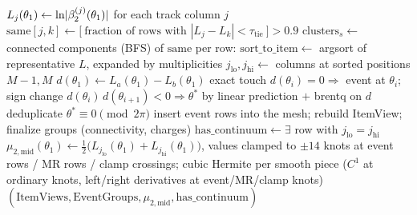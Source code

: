 
\begin{algorithm}
\caption{\textsc{AnalyzeMu2Mid}$(zm,\mathrm{poly},E,\mu_1;\tau_{\mathrm{tie}},\tau_{\mathrm{cross}})$ —
build the $\mu_{2,\mathrm{mid}}$ base manifold: continuum clustering, pairwise crossings, Hermite path.}
\label{alg:analyze-mu2mid}
\begin{algorithmic}[1]
\State {}
  \State $L_j(\theta_1)\gets\ln\lvert \beta_2^{(j)}(\theta_1)\rvert$ for each track column $j$
  \State $\mathrm{same}[j,k]\gets\Big[\ \text{fraction of rows with } |L_j-L_k|<\tau_{\mathrm{tie}}\ \Big] > 0.9$
  \State $\mathrm{clusters}_s\gets$ connected components (BFS) of $\mathrm{same}$
\EndFor
\State {}
\State per row: $\mathrm{sort\_to\_item}\gets$ argsort of representative $L$, expanded by multiplicities
\State $j_{\mathrm{lo}},j_{\mathrm{hi}}\gets$ columns at sorted positions $M{-}1,M$
\State {}
  \State $d(\theta_1)\gets L_a(\theta_1)-L_b(\theta_1)$
  \State exact touch $d(\theta_i)=0\Rightarrow$ event at $\theta_i$; sign change $d(\theta_i)\,d(\theta_{i+1})<0\Rightarrow\theta^*$ by linear prediction $+$ brentq on $d$
  \State deduplicate $\theta^*\equiv0\pmod{2\pi}$
\EndFor
\State {}
\State insert event rows into the mesh; rebuild ItemView; finalize groups (connectivity, charges)
\State $\mathrm{has\_continuum}\gets\exists$ row with $j_{\mathrm{lo}}=j_{\mathrm{hi}}$ 
\State {}
\State $\mu_{2,\mathrm{mid}}(\theta_1)\gets\tfrac12\big(L_{j_{\mathrm{lo}}}(\theta_1)+L_{j_{\mathrm{hi}}}(\theta_1)\big)$, values clamped to $\pm14$
\State knots at event rows / MR rows / clamp crossings; cubic Hermite per smooth piece ($C^1$ at ordinary knots, left/right derivatives at event/MR/clamp knots)
\State \Return $(\mathrm{ItemViews},\mathrm{EventGroups},\mu_{2,\mathrm{mid}},\mathrm{has\_continuum})$
\end{algorithmic}
\end{algorithm}

